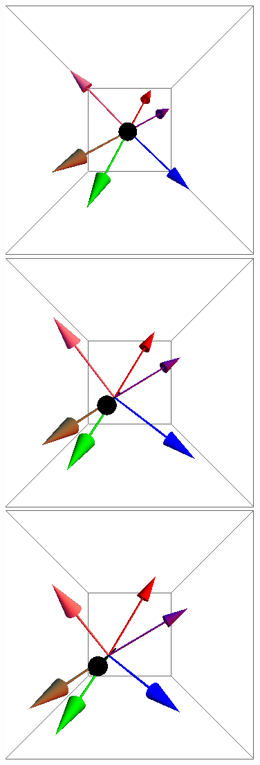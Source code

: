 \documentclass{article}
\begin{document}
\begin{figure}[ht]
\includegraphics[scale=0.22]{100/55S000to005G.png}
\includegraphics[scale=0.22]{100/419S000to005G.png}
\includegraphics[scale=0.22]{100/466S000to005G.png}

\end{figure}
\end{document}
